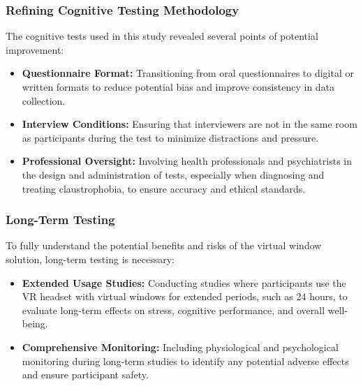 \documentclass[runningheads]{llncs}
\begin{document}
\subsubsection{Refining Cognitive Testing Methodology}

The cognitive tests used in this study revealed several points of potential improvement:

\begin{itemize}
    \item \textbf{Questionnaire Format:} Transitioning from oral questionnaires to digital or written formats to reduce potential bias and improve consistency in data collection.
    \item \textbf{Interview Conditions:} Ensuring that interviewers are not in the same room as participants during the test to minimize distractions and pressure.
    \item \textbf{Professional Oversight:} Involving health professionals and psychiatrists in the design and administration of tests, especially when diagnosing and treating claustrophobia, to ensure accuracy and ethical standards.
\end{itemize}

\subsubsection{Long-Term Testing}

To fully understand the potential benefits and risks of the virtual window solution, long-term testing is necessary:

\begin{itemize}
    \item \textbf{Extended Usage Studies:} Conducting studies where participants use the VR headset with virtual windows for extended periods, such as 24 hours, to evaluate long-term effects on stress, cognitive performance, and overall well-being.
    \item \textbf{Comprehensive Monitoring:} Including physiological and psychological monitoring during long-term studies to identify any potential adverse effects and ensure participant safety.
\end{itemize}
\end{document}
